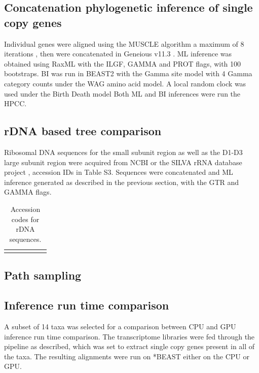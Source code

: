 \documentclass[12pt]{article}
\begin{document}
\subsection*{Concatenation phylogenetic inference of single copy genes}
Individual genes were aligned using the MUSCLE algorithm a maximum of 8 iterations \cite{edgar2004muscle}, then were concatenated in Geneious v11.3 \cite{kearse2012geneious}. 
ML inference was obtained using RaxML \cite{stamatakis2014raxml} with the ILGF, GAMMA and PROT flags, with 100 bootstraps.
BI was run in BEAST2 with the Gamma site model with 4 Gamma category counts under the WAG amino acid model. A local random clock was used  under the Birth Death model %
Both ML and BI inferences were run the HPCC. 

\subsection*{rDNA based tree comparison}
Ribosomal DNA sequences for the small subunit region as well as the D1-D3 large subunit region were acquired from NCBI \cite{coordinators2017database} or the SILVA rRNA database project \cite{silvaproj}, accession IDs in Table S3. 
Sequences were concatenated and ML inference generated as described in the previous section, with the GTR and GAMMA flags.

\FloatBarrier
\begin{longtable}{  | p{3cm} |p{2cm} | p{2cm} | p{2cm} | p{2cm} | p{2cm} |}
\caption{Accession codes for rDNA sequences.}\\
\hline
\label{tbl:rDNA}
\end{longtable}

\subsection*{Path sampling}

\subsection*{Inference run time comparison}
A subset of 14 taxa was selected for a comparison between CPU and GPU inference run time comparison. 
The transcriptome libraries were fed through the pipeline as described, which was set to extract single copy genes present in all of the taxa. 
The resulting alignments were run on *BEAST either on the CPU or GPU.
\end{document}
